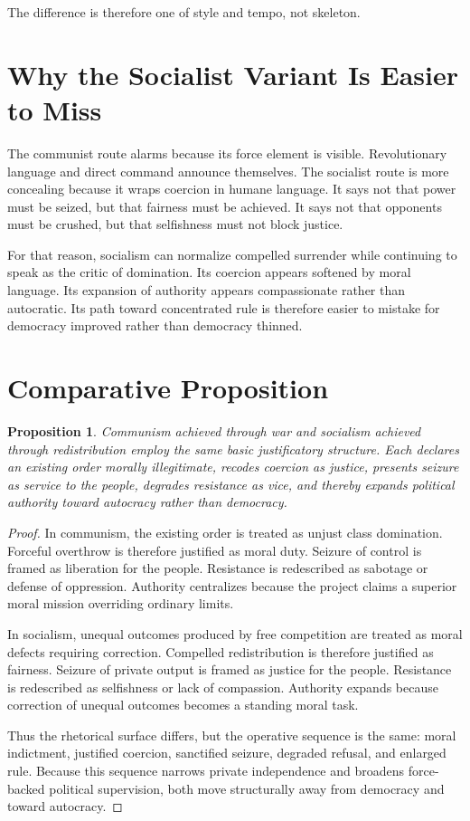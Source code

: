 \documentclass[12pt,letterpaper]{article}
\newtheorem{proposition}{Proposition}[section]
\begin{document}
The difference is therefore one of style and tempo, not skeleton.

\section{Why the Socialist Variant Is Easier to Miss}

The communist route alarms because its force element is visible. Revolutionary language and
direct command announce themselves. The socialist route is more concealing because it wraps
coercion in humane language. It says not that power must be seized, but that fairness must
be achieved. It says not that opponents must be crushed, but that selfishness must not block
justice.

For that reason, socialism can normalize compelled surrender while continuing to speak as
the critic of domination. Its coercion appears softened by moral language. Its expansion of
authority appears compassionate rather than autocratic. Its path toward concentrated rule is
therefore easier to mistake for democracy improved rather than democracy thinned.

\section{Comparative Proposition}

\begin{proposition}
Communism achieved through war and socialism achieved through redistribution employ the
same basic justificatory structure. Each declares an existing order morally illegitimate, recodes
coercion as justice, presents seizure as service to the people, degrades resistance as vice, and
thereby expands political authority toward autocracy rather than democracy.
\end{proposition}

\begin{proof}
In communism, the existing order is treated as unjust class domination. Forceful overthrow is
therefore justified as moral duty. Seizure of control is framed as liberation for the people.
Resistance is redescribed as sabotage or defense of oppression. Authority centralizes because
the project claims a superior moral mission overriding ordinary limits.

In socialism, unequal outcomes produced by free competition are treated as moral defects
requiring correction. Compelled redistribution is therefore justified as fairness. Seizure of
private output is framed as justice for the people. Resistance is redescribed as selfishness or
lack of compassion. Authority expands because correction of unequal outcomes becomes a
standing moral task.

Thus the rhetorical surface differs, but the operative sequence is the same: moral indictment,
justified coercion, sanctified seizure, degraded refusal, and enlarged rule. Because this
sequence narrows private independence and broadens force-backed political supervision, both
move structurally away from democracy and toward autocracy.
\end{proof}
\end{document}
